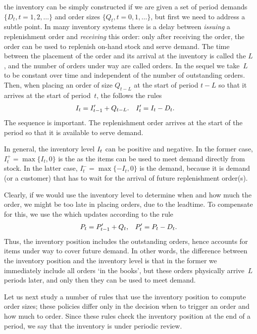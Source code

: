 \documentclass[queueing-book.tex]{subfiles}
\begin{document}
 the inventory can be simply constructed if we are given a set of period demands $\{D_t, t=1, 2, \ldots\}$ and order sizes $\{Q_t, t=0, 1, \ldots\}$, but first we need to address a subtle point.
In many inventory systems there is a delay between \emph{issuing} a replenishment order and \emph{receiving} this order:  only after receiving the order, the order can be used to replenish on-hand stock and serve demand.  The time between the placement of the order and its arrival at the inventory is called the  $L$, and the number of orders under way are called  orders. In the sequel we take~$L$ to be constant over time and independent of the number of outstanding orders.
Then, when placing an order of size $Q_{t-L}$ at the start of period $t-L$ so that it arrives at the start of period~$t$,  the   follows  the rules
\begin{align}\label{eq:i5}
  I_t &= I_{t-1}'+Q_{t-L}. & I_t' &= I_{t} - D_t.
\end{align}
The sequence is important. The replenishment order arrives at the start of the period so that it is available to serve demand.

In general, the inventory level $I_t$ can be positive and negative.
In the former case, $I_t^{+} = \max\{I_t,0\}$ is the  as the items can be used to meet demand directly from stock.
In the latter case, $I^{-}_t = \max\{-I_t, 0\}$ is the  demand, because it is demand (or a customer) that has to wait for the arrival of future replenishment order(s).

Clearly, if we would use the inventory level to determine when and how much the order, we might be too late in placing orders, due to the leadtime. To compensate for this, we use the   which updates according to the rule
\begin{align}\label{eq:b9}
  P_t &= P_{t-1}' + Q_t, & P_t' = P_{t}- D_t.
\end{align}
Thus, the inventory position includes the outstanding orders, hence accounts for items under way to cover future demand.
In other words, the difference between the inventory position and the inventory level is that in the former we immediately include all orders `in the books', but these orders physically arrive~$L$ periods later, and only then they can be used to meet demand.


Let us next study a number of rules that use the inventory position to compute order sizes; these policies differ only in the decision when to trigger an order and how much to order. Since these rules check the inventory position at the end of a period, we say that the inventory is under periodic review.
\end{document}
